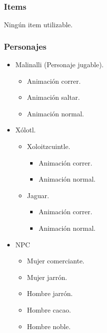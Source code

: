 \documentclass[11pt,letterpaper]{article}
\begin{document}
	\subsubsection{Items}
Ningún item utilizable.
	\subsubsection{Personajes}
\begin{itemize}
\item Malinalli (Personaje jugable).
	\begin{itemize}
		\item Animación correr.
		\item Animación saltar. 
		\item Animación normal. 
	\end{itemize}	
\item Xólotl.
	\begin{itemize}
		\item Xoloitzcuintle.
			\begin{itemize}
				\item Animación correr.
				\item Animación normal. 
		\end{itemize}	
		\item Jaguar.
			\begin{itemize}
				\item Animación correr.
				\item Animación normal. 
		\end{itemize}	
	\end{itemize}	

\item NPC 
	\begin{itemize}
		\item Mujer comerciante.
		\item Mujer jarrón. 
		\item Hombre jarrón. 
		\item Hombre cacao.
		\item Hombre noble.
	\end{itemize}	 
\end{itemize}
\end{document}

